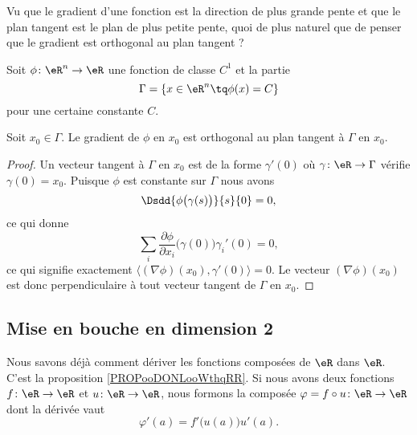 Vu que le gradient d'une fonction est la direction de plus grande pente et que le plan tangent est le plan de plus petite pente, quoi de plus naturel que de penser que le gradient est orthogonal au plan tangent ?

\begin{lemma}
	Soit \( \phi\colon \eR^n\to \eR\) une fonction de classe \( C^1\) et la partie
	\begin{equation}
		\Gamma=\{ x\in \eR^n\tq \phi(x)=C \}
	\end{equation}
	pour une certaine constante \( C\).

	Soit \( x_0\in \Gamma\). Le gradient de \( \phi\) en \( x_0\) est orthogonal au plan tangent à \( \Gamma\) en \( x_0\).
\end{lemma}

\begin{proof}
	Un vecteur tangent à \( \Gamma\) en \( x_0\) est de la forme \( \gamma'(0)\) où \( \gamma\colon \eR \to \Gamma\) vérifie \( \gamma(0)=x_0\). Puisque \( \phi\) est constante sur \( \Gamma\) nous avons
	\begin{equation}
		\Dsdd{ \phi\big( \gamma(s) \big) }{s}{0}=0,
	\end{equation}
	ce qui donne
	\begin{equation}
		\sum_i\frac{ \partial \phi }{ \partial x_i }\big( \gamma(0) \big)\gamma_i'(0)=0,
	\end{equation}
	ce qui signifie exactement \( \langle (\nabla\phi)(x_0), \gamma'(0)\rangle=0\). Le vecteur \( (\nabla\phi)(x_0)\) est donc perpendiculaire à tout vecteur tangent de \( \Gamma\) en \( x_0\).
\end{proof}

\subsection{Mise en bouche en dimension 2}

Nous savons déjà comment dériver les fonctions composées de \( \eR\) dans \( \eR\). C'est la proposition \ref{PROPooDONLooWthqRR}. Si nous avons deux fonctions \( f\colon \eR\to \eR\) et \( u\colon \eR\to \eR\), nous formons la composée \( \varphi=f\circ u\colon \eR\to \eR\) dont la dérivée vaut
\begin{equation}
	\varphi'(a)=f'\big( u(a) \big)u'(a).
\end{equation}

